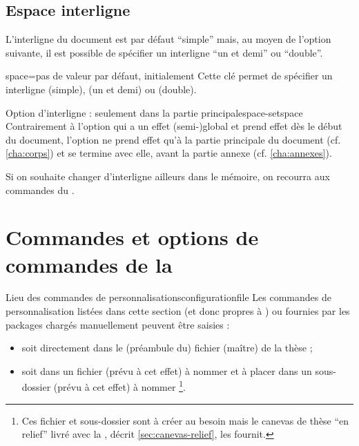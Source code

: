 \subsection{Espace interligne}\label{sec:interligne}

L'interligne du document est par défaut \enquote{simple} mais, au moyen de
l'option  suivante, il est possible de spécifier un interligne
\enquote{un et demi} ou \enquote{double}.

\begin{docKey}{space}{=\textbar{}\textbar{}}{pas de valeur par défaut,
    initialement }
  Cette clé permet de spécifier un interligne  (simple),
   (un et demi) ou  (double).
\end{docKey}

\begin{dbwarning}{Option d'interligne : seulement dans la partie
    principale}{space-setspace}
  Contrairement à l'option  qui a un effet (semi-)global et
  prend effet dès le début du document, l'option  ne prend effet
  qu'à la partie principale du document (cf. \vref{cha:corps}) et se termine
  avec elle, avant la partie annexe (cf. \vref{cha:annexes}).
\end{dbwarning}

Si on souhaite changer d'interligne ailleurs dans le mémoire, on recourra aux
commandes du  .

\section{Commandes et options de commandes de la \yatcl}

\begin{dbremark}{Lieu des commandes de personnalisations}{configurationfile}
  Les commandes de personnalisation listées dans cette section (et donc propres
  à \yatcl{}) ou fournies par les packages chargés manuellement peuvent être
  saisies :
  \begin{itemize}
  \item soit directement dans le (préambule du) fichier (maître) de la thèse ;
  \item soit dans un fichier (prévu à cet effet) à nommer
    \file{\configurationfile} et à placer dans un sous-dossier (prévu à cet
    effet) à nommer \directory{\configurationdirectory}\footnote{Ces fichier et
      sous-dossier sont à créer au besoin mais le canevas de thèse \enquote{en
        relief} livré avec la \yatcl, décrit \vref{sec:canevas-relief}, les
      fournit.}.
  \end{itemize}
\end{dbremark}

